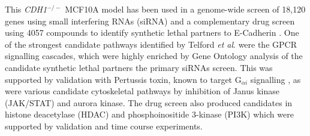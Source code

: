 This \textit{CDH1}$^{-/-}$  MCF10A model has been used in a genome-wide screen of 18,120 genes using small interfering RNAs (siRNA) and a complementary drug screen using 4057 compounds to identify synthetic lethal partners to E-Cadherin \cite{Telford2015}. One of the strongest candidate pathways identified by Telford \textit{et al}. \cite{Telford2015} were the GPCR signalling cascades, which were highly enriched by Gene Ontology analysis of the candidate synthetic lethal partners the primary siRNAs screen. This was supported by validation with Pertussis toxin, known to target  G$_{\alpha i}$ signalling \cite{Clark2004}, as were various candidate cytoskeletal pathways by inhibition of Janus kinase (JAK/STAT) and aurora kinase. The drug screen also produced candidates in histone deacetylase (HDAC) and phosphoinositide 3-kinase (PI3K) which were supported by validation and time course experiments.



